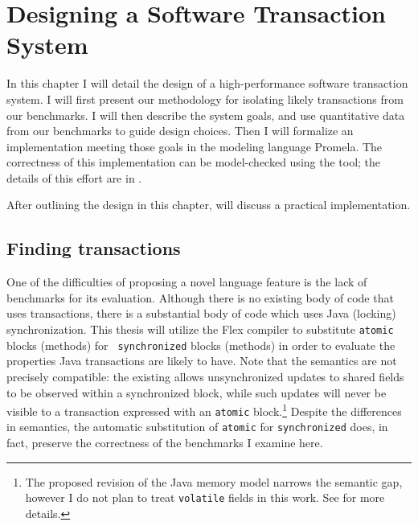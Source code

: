 \chapter{Designing a Software Transaction System}\label{sec:stm}

In this chapter I will detail the design of a
high-performance software transaction system.  I will first present
our methodology for isolating likely transactions from our benchmarks.
I will then describe the system goals, and use quantitative data from
our benchmarks to guide design choices.  Then I will formalize an
implementation meeting those goals in the modeling language
Promela.  The correctness of this implementation can be model-checked
using the \Spin tool; the details of this effort are in
.

After outlining the design in this chapter,  will
discuss a practical implementation.

\section{Finding transactions}\label{sec:auto}
One of the difficulties of proposing a novel language feature is the
lack of benchmarks for its evaluation.  Although there is no existing body of
code that uses transactions, there is a substantial body of
code which uses Java (locking) synchronization.  This thesis will
utilize the Flex compiler \cite{Flex} to
substitute {\tt atomic} blocks (methods) for {\tt
  synchronized} blocks (methods) in order to evaluate the properties
Java transactions are likely to have.  Note that the semantics are not
precisely compatible: the existing  allows
unsynchronized updates to shared fields to be observed within a
synchronized block, while such updates will never be visible to a
transaction expressed with an
{\tt atomic} block.\footnote{The proposed revision of the Java memory model
\cite{MansonPu02} narrows the semantic gap, however I do not
plan to treat {\tt volatile} fields in this work.  See
 for more details.}
Despite the differences in semantics, the automatic substitution of
{\tt atomic} for {\tt synchronized} does, in fact, preserve the
correctness of the benchmarks I examine here.

